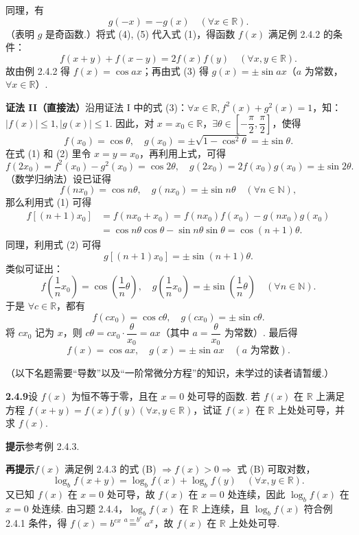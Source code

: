 \documentclass[UTF8,12pt,a4paper,fontset=fandol]{ctexart}
\begin{document}
同理，有
\[
  g(-x)=-g(x)\quad(\forall x\in\mathbb{R}). \tag{5}
\]
（表明 $g$ 是奇函数.）将式 (4), (5) 代入式 (1)，得函数 $f(x)$ 满足例 2.4.2 的条件：
\[
  f(x+y)+f(x-y)=2f(x)f(y)\quad(\forall x,y\in\mathbb{R}).
\]
故由例 2.4.2 得 $f(x)=\cos ax$；再由式 (3) 得 $g(x)=\pm\sin ax$（$a$ 为常数，$\forall x\in\mathbb{R}$）.

\noindent\textbf{证法 II（直接法）}\quad 沿用证法 I 中的式 (3)：$\forall x\in\mathbb{R},f^2(x)+g^2(x)=1$，知：$|f(x)|\le1,|g(x)|\le1$. 因此，对 $x=x_0\in\mathbb{R}$，$\exists\theta\in\left[-\dfrac\pi2,\dfrac\pi2\right]$，使得
\[
  f(x_0)=\cos\theta,\quad g(x_0)=\pm\sqrt{1-\cos^2\theta}=\pm\sin\theta.
\]
在式 (1) 和 (2) 里令 $x=y=x_0$，再利用上式，可得
\[
  f(2x_0)=f^2(x_0)-g^2(x_0)=\cos2\theta,\quad
  g(2x_0)=2f(x_0)g(x_0)=\pm\sin2\theta. \tag{6}
\]
（数学归纳法）设已证得
\[
  f(nx_0)=\cos n\theta,\quad g(nx_0)=\pm\sin n\theta\quad(\forall n\in\mathbb{N}),
\]
那么利用式 (1) 可得
\[
\begin{aligned}
f[(n+1)x_0]
&=f(nx_0+x_0)=f(nx_0)f(x_0)-g(nx_0)g(x_0)\\
&=\cos n\theta\cos\theta-\sin n\theta\sin\theta=\cos(n+1)\theta.
\end{aligned}
\]
同理，利用式 (2) 可得
\[
  g[(n+1)x_0]=\pm\sin(n+1)\theta.
\]
类似可证出：
\[
  f\left(\frac1n x_0\right)=\cos\left(\frac1n\theta\right),\quad
  g\left(\frac1n x_0\right)=\pm\sin\left(\frac1n\theta\right)\quad(\forall n\in\mathbb{N}).
\]
于是 $\forall c\in\mathbb{R}$，都有
\[
  f(cx_0)=\cos c\theta,\quad g(cx_0)=\pm\sin c\theta.
\]
将 $cx_0$ 记为 $x$，则 $c\theta=cx_0\cdot\dfrac{\theta}{x_0}=ax$（其中 $a=\dfrac{\theta}{x_0}$ 为常数）. 最后得
\[
  f(x)=\cos ax,\quad g(x)=\pm\sin ax\quad(a\text{ 为常数}).
\]

\noindent（以下名题需要“导数”以及“一阶常微分方程”的知识，未学过的读者请暂缓.）

\noindent\textbf{2.4.9}\quad 设 $f(x)$ 为恒不等于零，且在 $x=0$ 处可导的函数. 若 $f(x)$ 在 $\mathbb{R}$ 上满足方程 $f(x+y)=f(x)f(y)(\forall x,y\in\mathbb{R})$，试证 $f(x)$ 在 $\mathbb{R}$ 上处处可导，并求 $f(x)$.

\noindent\textbf{提示}\quad 参考例 2.4.3.

\noindent\textbf{再提示}\quad $f(x)$ 满足例 2.4.3 的式 (B) $\Rightarrow f(x)>0\Rightarrow$ 式 (B) 可取对数，
\[
  \log_b f(x+y)=\log_b f(x)+\log_b f(y)\quad(\forall x,y\in\mathbb{R}).
\]
又已知 $f(x)$ 在 $x=0$ 处可导，故 $f(x)$ 在 $x=0$ 处连续，因此 $\log_b f(x)$ 在 $x=0$ 处连续. 由习题 2.4.4，$\log_b f(x)$ 在 $\mathbb{R}$ 上连续，且 $\log_b f(x)$ 符合例 2.4.1 条件，得 $f(x)=b^{cx}\overset{a=b^c}{=}a^x$，故 $f(x)$ 在 $\mathbb{R}$ 上处处可导.
\end{document}
